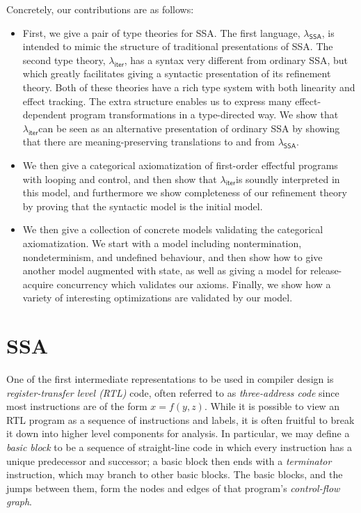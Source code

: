 \documentclass[acmsmall,screen,review]{acmart}
\newcommand{\ms}[1]{\ensuremath{\mathsf{#1}}}
\newcommand{\subiterexp}{\texorpdfstring{\(\lambda_{\ms{iter}}\)}{lambda-iter}}
\newcommand{\isotopessa}{\(\lambda_{\ms{SSA}}\)}
\begin{document}
Concretely, our contributions are as follows:

\begin{itemize}
\item First, we give a pair of type theories for SSA. The first
  language, \isotopessa, is intended to mimic the structure of
  traditional presentations of SSA. The second type theory,
  \subiterexp, has a syntax very different from ordinary SSA, but
  which greatly facilitates giving a syntactic presentation of its
  refinement theory. Both of these theories have a rich type system
  with both linearity and effect tracking. The extra structure enables
  us to express many effect-dependent program transformations in a
  type-directed way. We show that \subiterexp can be seen as an
  alternative presentation of ordinary SSA by showing that there are
  meaning-preserving translations to and from \isotopessa.
\item We then give a categorical axiomatization of first-order
  effectful programs with looping and control, and then show that
  \subiterexp is soundly interpreted in this model, and furthermore we
  show completeness of our refinement theory by proving that the
  syntactic model is the initial model.
\item We then give a collection of concrete models validating the
  categorical axiomatization. We start with a model including
  nontermination, nondeterminism, and undefined behaviour, and then
  show how to give another model augmented with state, as well as
  giving a model for release-acquire concurrency which validates our
  axioms. Finally, we show how a variety of interesting optimizations
  are validated by our model.
\end{itemize}

\section{SSA}

\label{sec:ssa-intro}

One of the first intermediate representations to be used in compiler design is
\emph{register-transfer level (RTL)} code, often referred to as \emph{three-address code} since most
instructions are of the form $x = f(y, z)$. While it is possible to view an RTL program as a
sequence of instructions and labels, it is often fruitful to break it down into higher level
components for analysis. In particular, we may define a \emph{basic block} to be a sequence of
straight-line code in which every instruction has a unique predecessor and successor; a basic block
then ends with a \emph{terminator} instruction, which may branch to other basic blocks. The basic
blocks, and the jumps between them, form the nodes and edges of that program's \emph{control-flow
graph}.
\end{document}
